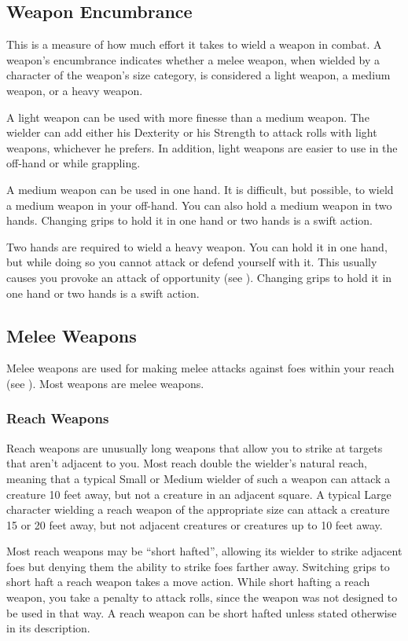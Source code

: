 \subsection{Weapon Encumbrance}
This is a measure of how much effort it takes to wield a weapon in combat. A weapon's encumbrance indicates whether a melee weapon, when wielded by a character of the weapon's size category, is considered a light weapon, a medium weapon, or a heavy weapon.

 A light weapon can be used with more finesse than a medium weapon. The wielder can add either his Dexterity or his Strength to attack rolls with light weapons, whichever he prefers. In addition, light weapons are easier to use in the off-hand or while grappling.

 A medium weapon can be used in one hand. It is difficult, but possible, to wield a medium weapon in your off-hand. You can also hold a medium weapon in two hands. Changing grips to hold it in one hand or two hands is a swift action. 

 Two hands are required to wield a heavy weapon. You can hold it in one hand, but while doing so you cannot attack or defend yourself with it. This usually causes you provoke an attack of opportunity (see ). Changing grips to hold it in one hand or two hands is a swift action.

\subsection{Melee Weapons}
Melee weapons are used for making melee attacks against foes within your reach (see ). Most weapons are melee weapons.

\subsubsection{Reach Weapons}
Reach weapons are unusually long weapons that allow you to strike at targets that aren't adjacent to you. Most reach double the wielder's natural reach, meaning that a typical Small or Medium wielder of such a weapon can attack a creature 10 feet away, but not a creature in an adjacent square. A typical Large character wielding a reach weapon of the appropriate size can attack a creature 15 or 20 feet away, but not adjacent creatures or creatures up to 10 feet away.

 Most reach weapons may be ``short hafted'', allowing its wielder to strike adjacent foes but denying them the ability to strike foes farther away. Switching grips to short haft a reach weapon takes a move action. While short hafting a reach weapon, you take a  penalty to attack rolls, since the weapon was not designed to be used in that way. A reach weapon can be short hafted unless stated otherwise in its description.

